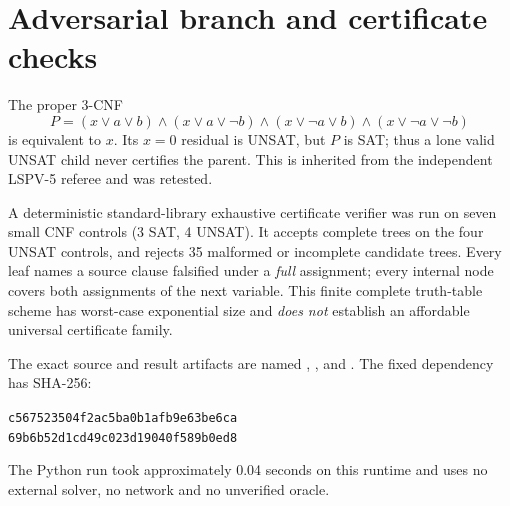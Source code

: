 \documentclass[11pt]{article}
\begin{document}
\section{Adversarial branch and certificate checks}
The proper 3-CNF
\[
 P=(x\vee a\vee b)\land(x\vee a\vee\neg b)
\land(x\vee\neg a\vee b)\land(x\vee\neg a\vee\neg b)
\]
is equivalent to $x$. Its $x=0$ residual is UNSAT, but $P$ is SAT;
thus a lone valid UNSAT child never certifies the parent. This
is inherited from the independent LSPV-5 referee and was retested.

A deterministic standard-library exhaustive certificate verifier
was run on seven small CNF controls (3 SAT, 4 UNSAT).
It accepts complete trees on the four UNSAT controls, and rejects
35 malformed or incomplete candidate trees. Every leaf names a
source clause falsified under a \emph{full} assignment; every internal
node covers both assignments of the next variable. This finite
complete truth-table scheme has worst-case exponential size and
\emph{does not} establish an affordable universal certificate family.

The exact source and result artifacts are named
,
, and
.
The fixed dependency has SHA-256:
\begin{center}\footnotesize
\texttt{c567523504f2ac5ba0b1afb9e63be6ca}\\
\texttt{69b6b52d1cd49c023d19040f589b0ed8}
\end{center}
The Python run took approximately 0.04 seconds on this runtime and
uses no external solver, no network and no unverified oracle.
\end{document}
